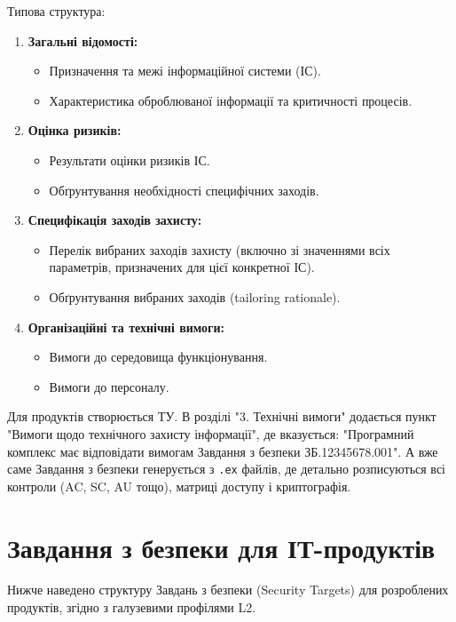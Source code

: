 \documentclass{article}
\begin{document}
Типова структура:
\begin{enumerate}
    \item \textbf{Загальні відомості:}
    \begin{itemize}
        \item Призначення та межі інформаційної системи (ІС).
        \item Характеристика оброблюваної інформації та критичності процесів.
    \end{itemize}
    \item \textbf{Оцінка ризиків:}
    \begin{itemize}
        \item Результати оцінки ризиків ІС.
        \item Обґрунтування необхідності специфічних заходів.
    \end{itemize}
    \item \textbf{Специфікація заходів захисту:}
    \begin{itemize}
        \item Перелік вибраних заходів захисту (включно зі значеннями всіх параметрів, призначених для цієї конкретної ІС).
        \item Обґрунтування вибраних заходів (tailoring rationale).
    \end{itemize}
    \item \textbf{Організаційні та технічні вимоги:}
    \begin{itemize}
        \item Вимоги до середовища функціонування.
        \item Вимоги до персоналу.
    \end{itemize}
\end{enumerate}

Для продуктів створюється ТУ. В розділі "3. Технічні вимоги" додається пункт "Вимоги щодо технічного захисту інформації",
де вказується: "Програмний комплекс має відповідати вимогам Завдання з безпеки ЗБ.12345678.001".
А вже саме Завдання з безпеки генерується з \texttt{.ex} файлів, де детально розписуються всі
контроли (AC, SC, AU тощо), матриці доступу і криптографія.

\section{Завдання з безпеки для ІТ-продуктів}

Нижче наведено структуру Завдань з безпеки (Security Targets) для розроблених продуктів, згідно з галузевими профілями L2.
\end{document}
